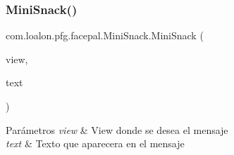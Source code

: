 \subsubsection{\texorpdfstring{Mini\+Snack()}{MiniSnack()}}
{\footnotesize\ttfamily com.\+loalon.\+pfg.\+facepal.\+Mini\+Snack.\+Mini\+Snack (\begin{DoxyParamCaption}\item[{View}]{view,  }\item[{String}]{text }\end{DoxyParamCaption})}


\begin{DoxyParams}{Parámetros}
{\em view} & View donde se desea el mensaje \\
\hline
{\em text} & Texto que aparecera en el mensaje \\
\hline
\end{DoxyParams}

